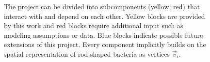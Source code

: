 \documentclass{article}
\begin{document}

\begin{figure}[H]
    \centering
    
    \caption{
        The project can be divided into subcomponents (yellow, red) that interact with and depend on
        each other.
        Yellow blocks are provided by this work and red blocks require additional input such as
        modeling assumptions or data.
        Blue blocks indicate possible future extensions of this project.
        Every component implicitly builds on the spatial representation of rod-shaped bacteria as
        vertices $\vec{v}_i$.
    }
    \label{fig:flowchart-project-structure}
\end{figure}
\end{document}
